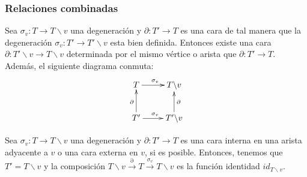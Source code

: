 \documentclass[../main.tex]{subfiles}
\begin{document}
\subsubsection*{Relaciones combinadas}
Sea $\sigma_v\colon T\to T\backslash v$ una degeneraci\'on y $\partial\colon T' \to T$ es una cara de tal manera que la degeneraci\'on $\sigma_v\colon T'\to T'\backslash v$ esta bien definida. Entonces existe una cara $\partial\colon T'\backslash v \to T\backslash v$ determinada por el mismo v\'ertice o arista que $\partial\colon T' \to T$.
Adem\'as, el siguiente diagrama conmuta:
$$
    \xymatrix{
        T  \ar[r]^{\sigma_v}
        &T\backslash v \\
        T' \ar[u]^{\partial} \ar[r]^{\sigma_v}
        &T'\backslash v \ar[u]_{\partial}
    }
$$

Sea $\sigma_v\colon T\to T\backslash v$ una degeneraci\'on y $\partial\colon T' \to T$ es una cara interna en una arista adyacente a $v$ o una cara externa en $v$, si es posible. Entonces, tenemos que $T'=T\backslash v$ y la composici\'on
$    T\backslash v \overset{\partial}{\longrightarrow} T \overset{\sigma_v}{\longrightarrow} T\backslash v$ es la funci\'on identidad $id_{T\backslash v}$.
\end{document}
